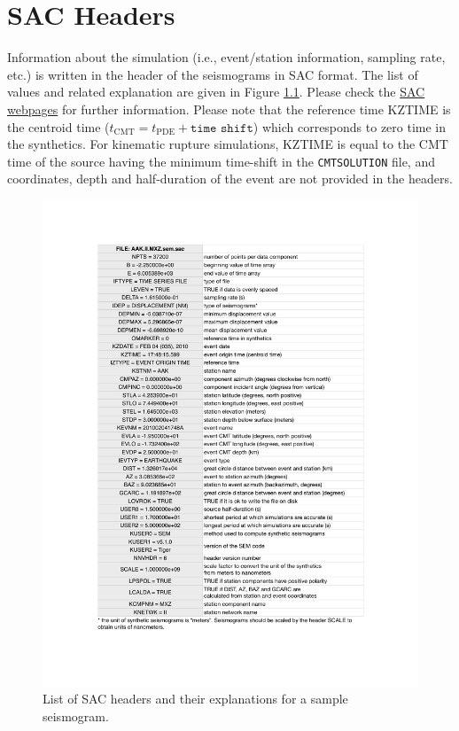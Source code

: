 \chapter{SAC Headers}\label{cha:SAC-headers}

Information about the simulation (i.e., event/station information, sampling rate, etc.)
is written in the header of the seismograms in SAC format.
The list of values and related explanation are given in Figure \ref{fig:SAC-headers}.
Please check the \href{http://www.iris.edu/software/sac/}{SAC webpages} for further information.
Please note that the reference time KZTIME is the centroid time ($t_\text{CMT}=t_\text{PDE}+\texttt{time shift}$)
which corresponds to zero time in the synthetics.
For kinematic rupture simulations, KZTIME is equal to the CMT time of the source having the minimum time-shift
in the \texttt{CMTSOLUTION} file, and coordinates, depth and half-duration of the event are not provided in the headers.
%
\begin{figure}[htp]
\includegraphics[scale=0.85]{figures/headers_sem_explained.pdf}
\caption{List of SAC headers and their explanations for a sample seismogram.}
\label{fig:SAC-headers}
\end{figure}




